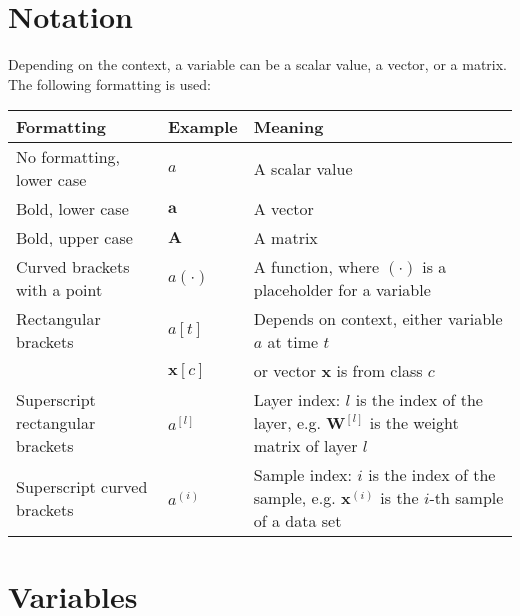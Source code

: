 

\section{Notation}

Depending on the context, a variable can be a scalar value, a vector, or a matrix. The following formatting is used:

\begin{tabular}{ p{5cm} p{2cm} p{7cm} }
	\textbf{Formatting} & \textbf{Example} & \textbf{Meaning}\\
	\hline
  	No formatting, lower case & $a$ & A scalar value\\
  	Bold, lower case & $\boldsymbol{a}$ & A vector\\
  	Bold, upper case & $\boldsymbol{A}$ & A matrix\\
  	Curved brackets with a point & $a(\cdot)$ & A function, where $(\cdot)$ is a placeholder for a variable\\
  	Rectangular brackets    & $a[t]$ & Depends on context, either variable $a$ at time $t$\\
							& $\boldsymbol{x}[c]$ & or vector $\boldsymbol{x}$ is from class $c$\\
  	Superscript rectangular brackets & $a^{[l]}$ & Layer index: $l$ is the index of the layer, e.g. $\boldsymbol{W}^{[l]}$ is the weight matrix of layer $l$\\
  	Superscript curved brackets & $a^{(i)}$ & Sample index: $i$ is the index of the sample, e.g. $\boldsymbol{x}^{(i)}$ is the $i$-th sample of a data set\\
\end{tabular}


\section{Variables}



